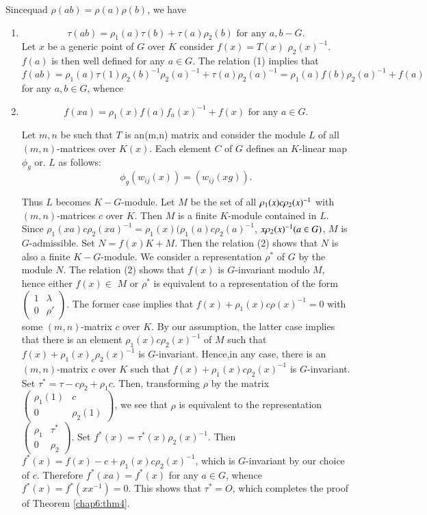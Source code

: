 Since\pageoriginale quad $\rho (ab) = \rho(a) \rho (b)$, we have
\begin{enumerate}[(1)]
\item $$ 
\tau (ab)= \rho_1 (a) \tau(b) + \tau(a) \rho_2 (b) \text{ for
  any } a, b-G.
 $$
  Let $x$ be a generic point of $G$ over $K$ consider $f(x)= T(x)$ 
$\rho _2(x)^{-1}$. $f(a)$ is then well defined for any $a \in G$. The
  relation (1) implies that $f(ab) =\rho_1(a) \tau (1) \rho_2 (b) ^{-1}
  \rho _2 (a) ^{-1} +  \tau(a) \rho_2 (a)^{-1}=\rho_1 (a) f(b) \rho_2 (a)^{-1}
  +f(a)$ for any $a, b \in G$, whence 
  
\item $$ f(xa) =\rho_1 (x) f(a) f_a (x) ^{-1} +f(x)   \text{ for any }
  a\in G.$$ 

  Let $m,n$ be such that $T$ is an(m,n) matrix and consider the module
  $L$ of all $(m,n)$-matrices over $K(x)$. Each element $C$ of
  $G$ defines an $K$-linear map $ \phi_{g} $ or. $L$ as follows: 
  $$ 
  \phi_g (w_{ij}(x)) = (w_{ij}(xg)).
  $$
  
  Thus $L$ becomes  $K-G$-module. Let  $M$ be the set of
  all  $\rho_1(x)c \rho_2\break (x)^{-1}$ with $(m, n)$-matrices
  $c$ over $K$. Then $M$ is a finite $K$-module contained in $L$.
  Since $\rho_1 (xa) c \rho_2 (xa)^{-1}= \rho_1 (x) (\rho_1
  (a) c \rho_2 (a)^{-1}$, $x \rho_2\break (x)^{-1} (a \in G)$, $M$ is
  $G$-admissible. Set $N=f(x) K+M$. Then the relation (2) shows 
  that $N$ is also a finite $K-G$-module. We consider a
  representation $\rho^* $ of $G$ by the module $N$.  The relation
  (2) shows  that $f(x)$ is $G$-invariant modulo $M$, hence either
  $f(x) \in $ $M$ or $\rho^* $ is equivalent to a representation of
  the form  $\begin{pmatrix} 1 & \lambda \\ 0 &
    \rho' \end{pmatrix}$. The former case implies that $f(x) + \rho_1
  (x) c \rho (x) ^{-1}=0$ with some $(m, n)$-matrix $c$  over
  $K$. By our assumption, the latter case implies that there is an
  element $ \rho _1(x)c \rho _2 (x)^{-1}$  of $M$ such that
  $f(x)+\rho_1(x)_c \rho_2(x)^{-1}$ is
  $G$-invariant. Hence,\pageoriginale in any 
  case, there is an $(m,n)$-matrix $c$ over $K$ such that $f(x)+
  \rho _1 (x) c \rho_2 (x) ^{-1}$ is $G$-invariant. Set $\tau^* = \tau
  -c  \rho_2 +\rho_1 c$.
  Then, transforming $\rho $ by the matrix $\begin{pmatrix} \rho_1(1)
    & c \\0 & \rho_2(1)\end{pmatrix}$,  we see that $\rho $ is
  equivalent to the representation $\begin{pmatrix} \rho_1 & \tau^*\\ 0 &
    \rho_2 \end{pmatrix}$. Set $f^* (x) = \tau^*(x) \rho_2 (x)^{-1}$.  
  Then $f^*(x) =f(x) -c + \rho _1 (x) c \rho_2 (x)^{-1}$, which is
  $G$-invariant by our choice of $c$. Therefore $f^*(xa) =f^*(x) $ for
  any $a \in G$, whence $f^*(x)=f^*(xx^{-1})=0$. This shows that
  $\tau^*=O$, which completes the proof of Theorem \ref{chap6:thm4}. 
\end{enumerate}

